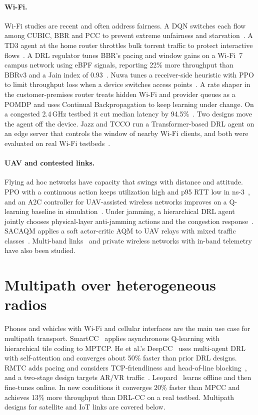 \paragraph{Wi-Fi.} Wi-Fi studies are recent and often address fairness. A DQN switches each flow among CUBIC, BBR and PCC to prevent extreme unfairness and starvation~\cite{shrestha2024fairness}. A TD3 agent at the home router throttles bulk torrent traffic to protect interactive flows~\cite{shawish2025wifi}. A DRL regulator tunes BBR's pacing and window gains on a Wi-Fi~7 campus network using eBPF signals, reporting 22\% more throughput than BBRv3 and a Jain index of 0.93~\cite{li2026sac}. Nuwa tunes a receiver-side heuristic with PPO to limit throughput loss when a device switches access points~\cite{gong2022nuwa}. A rate shaper in the customer-premises router treats hidden Wi-Fi and provider queues as a POMDP and uses Continual Backpropagation to keep learning under change. On a congested 2.4\,GHz testbed it cut median latency by 94.5\%~\cite{xue2026taming}. Two designs move the agent off the device. Jazz and TCCO run a Transformer-based DRL agent on an edge server that controls the window of nearby Wi-Fi clients, and both were evaluated on real Wi-Fi testbeds~\cite{wang2025edge,zhang2026transformer}.

\paragraph{UAV and contested links.} Flying ad hoc networks have capacity that swings with distance and attitude. PPO with a continuous action keeps utilization high and p95 RTT low in ns-3~\cite{cai2026deep}, and an A2C controller for UAV-assisted wireless networks improves on a Q-learning baseline in simulation~\cite{feng2023deep}. Under jamming, a hierarchical DRL agent jointly chooses physical-layer anti-jamming actions and the congestion response~\cite{yuan2024drl}. SACAQM applies a soft actor-critic AQM to UAV relays with mixed traffic classes~\cite{qian2026sacaqm}. Multi-band links~\cite{meng2024multi} and private wireless networks with in-band telemetry~\cite{bhat2024multi} have also been studied.

\section{Multipath over heterogeneous radios}
\label{sec:wireless-multipath}

Phones and vehicles with Wi-Fi and cellular interfaces are the main use case for multipath transport. SmartCC~\cite{li2019smartcc} applies asynchronous Q-learning with hierarchical tile coding to MPTCP. He et al.'s DeepCC~\cite{he2021deepcc} uses multi-agent DRL with self-attention and converges about 50\% faster than prior DRL designs. RMTC adds pacing and considers TCP-friendliness and head-of-line blocking~\cite{he2023learning}, and a two-stage design targets AR/VR traffic~\cite{xu2021reinforcement}. Leopard~\cite{liu2023leopard} learns offline and then fine-tunes online. In new conditions it converges 20\% faster than MPCC and achieves 13\% more throughput than DRL-CC on a real testbed. Multipath designs for satellite and IoT links are covered below.

